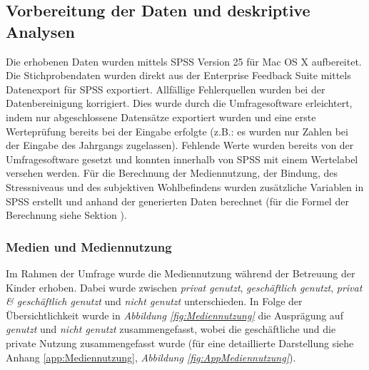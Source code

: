\subsection{Vorbereitung der Daten und deskriptive Analysen}
Die erhobenen Daten wurden mittels SPSS Version 25 für Mac OS X aufbereitet. Die Stichprobendaten wurden direkt aus der Enterprise Feedback Suite \cite{Questback2018} mittels Datenexport für SPSS exportiert. Allfällige Fehlerquellen wurden bei der Datenbereinigung korrigiert. Dies wurde durch die Umfragesoftware erleichtert, indem nur abgeschlossene Datensätze exportiert wurden und eine erste Werteprüfung bereits bei der Eingabe erfolgte (z.B.: es wurden nur Zahlen bei der Eingabe des Jahrgangs zugelassen). Fehlende Werte wurden bereits von der Umfragesoftware gesetzt und konnten innerhalb von SPSS mit einem Wertelabel versehen werden. Für die Berechnung der Mediennutzung, der Bindung, des Stressniveaus und des subjektiven Wohlbefindens wurden zusätzliche Variablen in SPSS erstellt und anhand der generierten Daten berechnet (für die Formel der Berechnung siehe Sektion \textit{}).

\subsubsection{Medien und Mediennutzung}
Im Rahmen der Umfrage wurde die Mediennutzung während der Betreuung der Kinder erhoben. Dabei wurde zwischen \textit{privat genutzt}, \textit{geschäftlich genutzt}, \textit{privat \& geschäftlich genutzt} und \textit{nicht genutzt} unterschieden. In Folge der Übersichtlichkeit wurde in \textit{Abbildung \ref{fig:Mediennutzung}} die Ausprägung auf \textit{genutzt} und \textit{nicht genutzt} zusammengefasst, wobei die geschäftliche und die private Nutzung zusammengefasst wurde (für eine detaillierte Darstellung siehe Anhang \ref{app:Mediennutzung}, \textit{Abbildung \ref{fig:AppMediennutzung}}).

